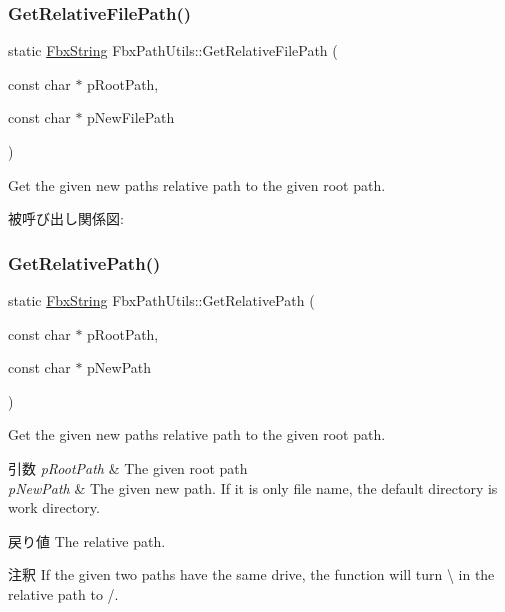 \subsubsection{\texorpdfstring{Get\+Relative\+File\+Path()}{GetRelativeFilePath()}}
{\footnotesize\ttfamily static \hyperlink{class_fbx_string}{Fbx\+String} Fbx\+Path\+Utils\+::\+Get\+Relative\+File\+Path (\begin{DoxyParamCaption}\item[{const char $\ast$}]{p\+Root\+Path,  }\item[{const char $\ast$}]{p\+New\+File\+Path }\end{DoxyParamCaption})\hspace{0.3cm}{\ttfamily [static]}}



Get the given new path\textquotesingle{}s relative path to the given root path. 

被呼び出し関係図\+:
\mbox{\label{class_fbx_path_utils_a311c2fe8ecb6dad2fc1a3b7935378598}} 
\subsubsection{\texorpdfstring{Get\+Relative\+Path()}{GetRelativePath()}}
{\footnotesize\ttfamily static \hyperlink{class_fbx_string}{Fbx\+String} Fbx\+Path\+Utils\+::\+Get\+Relative\+Path (\begin{DoxyParamCaption}\item[{const char $\ast$}]{p\+Root\+Path,  }\item[{const char $\ast$}]{p\+New\+Path }\end{DoxyParamCaption})\hspace{0.3cm}{\ttfamily [static]}}

Get the given new path\textquotesingle{}s relative path to the given root path. 
\begin{DoxyParams}{引数}
{\em p\+Root\+Path} & The given root path \\
\hline
{\em p\+New\+Path} & The given new path. If it is only file name, the default directory is work directory. \\
\hline
\end{DoxyParams}
\begin{DoxyReturn}{戻り値}
The relative path. 
\end{DoxyReturn}
\begin{DoxyRemark}{注釈}
If the given two paths have the same drive, the function will turn \textquotesingle{}\textbackslash{}\textquotesingle{} in the relative path to \textquotesingle{}/\textquotesingle{}. 
\end{DoxyRemark}
\mbox{\label{class_fbx_path_utils_a3b887263947d818084273ed982617fec}} 
